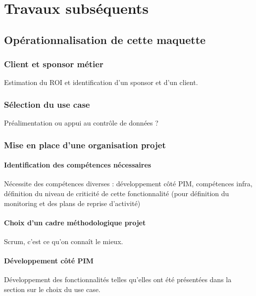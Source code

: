 \part{Travaux subséquents}
    \chapter{Opérationnalisation de cette maquette}    
        \section{Client et sponsor métier}
        Estimation du ROI et identification d'un sponsor et d'un client.

        \section{Sélection du use case}
        Préalimentation ou appui au contrôle de données ?

        \section{Mise en place d'une organisation projet}
            \subsection{Identification des compétences nécessaires}
            Nécessite des compétences diverses : développement côté PIM, compétences infra, définition du niveau de criticité de cette fonctionnalité (pour définition du monitoring et des plans de reprise d'activité)
            \subsection{Choix d'un cadre méthodologique projet}
            Scrum, c'est ce qu'on connaît le mieux.
            \subsection{Développement côté PIM}
            Développement des fonctionnalités telles qu'elles ont été présentées dans la section sur le choix du use case.


